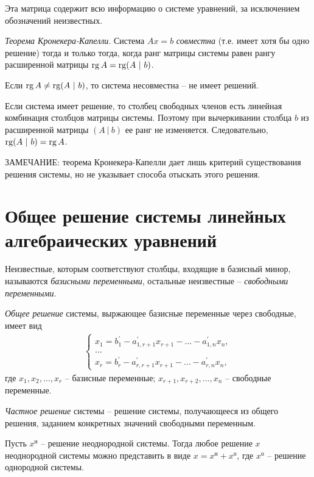 \documentclass[%
	11pt,
	a4paper,
	utf8,
		]{article}
\begin{document}
Эта матрица содержит всю информацию о системе уравнений, за исключением обозначений неизвестных.

\emph{Теорема Кронекера-Капелли}. Система $ A x = b $ \emph{совместна} (т.е. имеет хотя бы одно решение) тогда и только тогда, когда ранг матрицы системы равен рангу расширенной матрицы $ \operatorname*{rg} A = \operatorname*{rg} (A \ | \ b) $.

Если $ \operatorname*{rg} A \neq \operatorname*{rg} (A \ | \ b) $, то система несовместна -- не имеет решений.

Если система имеет решение, то столбец свободных членов есть линейная комбинация столбцов матрицы системы. Поэтому при вычеркивании столбца $ b $ из расширенной матрицы $ (A \ | \ b) $ ее ранг не изменяется. Следовательно, $ \operatorname*{rg} (A \ | \ b) = \operatorname*{rg} A $.

ЗАМЕЧАНИЕ: теорема Кронекера-Капелли дает лишь критерий существования решения системы, но не указывает способа отыскать этого решения.


\section{Общее решение системы линейных алгебраических уравнений}

Неизвестные, которым соответствуют столбцы, входящие в базисный минор, называются \emph{базисными переменными}, остальные неизвестные -- \emph{свободными переменными}.

\emph{Общее решение} системы, выржающее базисные переменные через свободные, имеет вид \cite[]{bortakovskiy:2005}
\begin{align*}
	\begin{cases}
		x_1 = b_1^{'} - a_{1, r + 1}^{'} x_{r + 1} - \ldots - a_{1, n}^{'} x_n, \\
		\ldots \\
		x_r = b_r^{'} - a_{r, r + 1}^{'} x_{r + 1} - \ldots - a_{r, n}^{'} x_n,
	\end{cases}
\end{align*}
где $ x_1, x_2, \ldots, x_r $ -- базисные переменные; $ x_{r + 1}, x_{r + 2}, \ldots, x_{n} $ -- свободные переменные.

\emph{Частное решение} системы -- решение системы, получающееся из общего решения, заданием конкретных значений свободными переменным.

Пусть $ x^{н} $ -- решение неоднородной системы. Тогда любое решение $ x $ неоднородной системы можно представить в виде $ x = x^\text{н} + x^\text{о} $, где $ x^\text{о} $ -- решение однородной системы.
\end{document}
